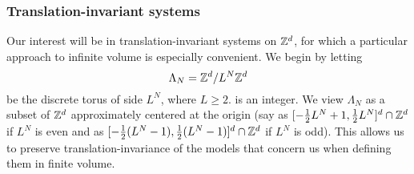 

\subsubsection{Translation-invariant systems}

Our interest will be in translation-invariant systems on ${ {{\mathbb Z}}^d }$, for which a particular
approach to infinite volume is especially convenient. We begin by letting
\begin{equation}
\Lambda_N = { {{\mathbb Z}}^d }/L^N{ {{\mathbb Z}}^d }
\end{equation}
be the discrete torus of side $L^N$, where $L \ge 2$. is an integer. We view $\Lambda_N$
as a subset of ${ {{\mathbb Z}}^d }$ approximately centered at the origin (say as
$[-\frac12 L^N+1,\frac12 L^N]^d \cap {\mathbb Z}^d$ if $L^N$ is even
and as $[-\frac12 (L^N-1), \frac12 (L^N-1)]^d \cap {\mathbb Z}^d$ if $L^N$ is odd). This allows us to preserve
translation-invariance of the models that concern us when defining them in finite volume.

